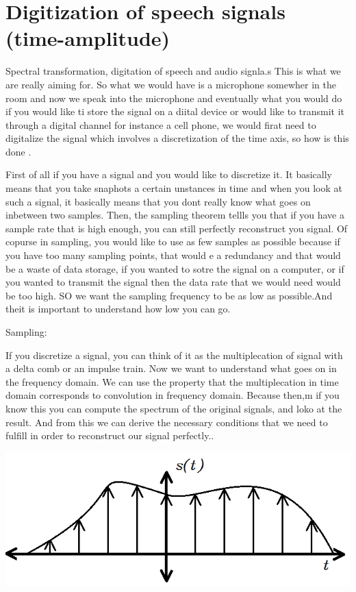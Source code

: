 \clearpage
\section{Digitization of speech signals (time-amplitude)}
\label{Digitization of speech signals (time-amplitude)}

Spectral transformation, digitation of speech and audio signla.s This is what we are really aiming for. So what we would have is a microphone somewher in the room and now we speak into the microphone and eventually what you would do if you would like ti store the signal on a diital device or would like to transmit it through a digital channel  for instance a cell phone, we would firat need to digitalize the signal which involves a discretization of the time axis, so how is this done .

First of all if you have a signal and you would like to discretize it. It basically means that you take snaphots a certain unstances in time  and when you look at such a signal, it basically means that you dont really know what goes on inbetween two samples.  Then, the sampling theorem tellls you that if you have a sample rate that is high enough, you can still perfectly reconstruct you signal. Of copurse in sampling, you would like to use as few samples as possible because if you have too many sampling points, that would e a redundancy and that would be a waste of data storage, if you wanted to sotre the signal on a computer, or if you wanted to transmit the signal then the data rate that we would need would be too high. SO we want the sampling frequency to be as low as possible.And theit is important to understand how low you can go.

Sampling:

If you discretize a signal, you can think of it as the multiplecation of signal with a delta comb or an impulse train.  Now we want to understand what goes on in the frequency domain. We can use the property that the multiplecation in time domain corresponds to convolution in frequency domain. Because then,m if you know this you can compute the spectrum of the original signals, and loko at the result. And from this we can derive the necessary conditions that we need to fulfill in order to reconstruct our signal perfectly..

\includegraphics[width=0.5\linewidth]{Pictures/Chapter_2_Lesson_1/Sampling4.png}

